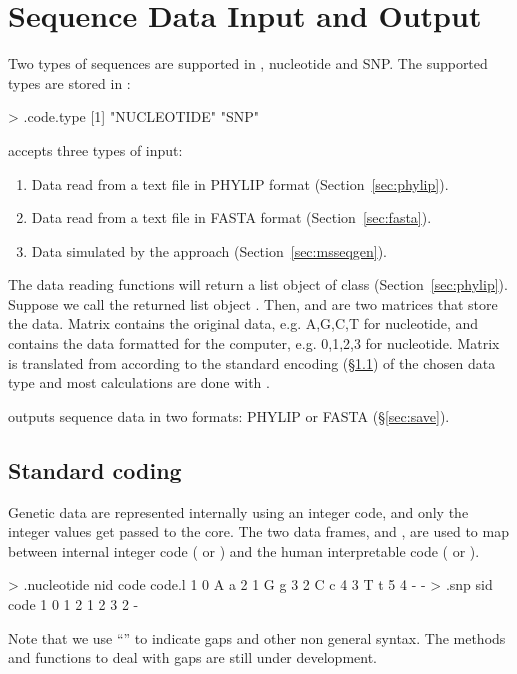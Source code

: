 \section[Sequence Data Input and Output]{Sequence Data Input and Output}
\label{sec:dataio}

Two types of sequences are supported in ,
nucleotide and SNP. The supported types are stored in :
\begin{Code}
> .code.type
[1] "NUCLEOTIDE" "SNP" 
\end{Code}
 accepts three types of input:
\begin{enumerate}
\item
Data read from a text file in PHYLIP format (Section~\ref{sec:phylip}).
\item
Data read from a text file in FASTA format (Section~\ref{sec:fasta}).
\item
Data simulated by the  approach (Section~\ref{sec:msseqgen}).
\end{enumerate}
The data reading functions  will return a list object of 
class {\color{red} } (Section~\ref{sec:phylip}).
Suppose we call the returned list object .
Then,  and  are two matrices that
store the data.
Matrix  contains the original data, e.g. A,G,C,T for
nucleotide, and
 contains the data formatted for the computer, e.g. 0,1,2,3 for nucleotide.
Matrix  is translated from 
according to the standard encoding (\S\ref{sec:coding}) of the chosen data type and most calculations are done with .

 outputs sequence data in two formats:
PHYLIP or FASTA (\S\ref{sec:save}).





\subsection[Standard coding]{Standard coding}
\label{sec:coding}

Genetic data are represented internally using an integer code, and only the integer values get passed to the  core.
The two data frames,  and ,
are used to map between internal integer code ( or ) and the human interpretable code ( or ).
\begin{Code}
> .nucleotide
  nid code code.l
1   0    A      a
2   1    G      g
3   2    C      c
4   3    T      t
5   4    -      -
> .snp
  sid code
1   0    1
2   1    2
3   2    -
\end{Code}
Note that we use ``\code{-}'' to indicate gaps and other non general syntax.
The methods and functions to deal with gaps are still under development.


